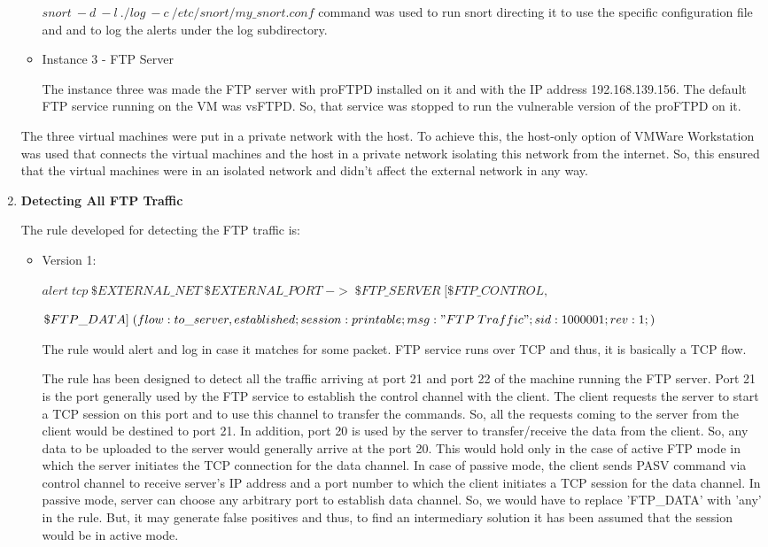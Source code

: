 \documentclass[11pt, pdftex]{article}
\begin{document}
\begin{enumerate}
\begin{itemize}
$snort\: -d\: -l\: ./log\: -c\: /etc/snort/my\_snort.conf$ command was used to run snort directing it to use the specific configuration file and and to log the alerts under the log subdirectory.

	\item Instance 3 - FTP Server
	
	The instance three was made the FTP server with proFTPD installed on it and with the IP address 192.168.139.156. The default FTP service running on the VM was vsFTPD. So, that service was stopped to run the vulnerable version of the proFTPD on it. 

\end{itemize}

The three virtual machines were put in a private network with the host. To achieve this, the host-only option of VMWare Workstation was used that connects the virtual machines and the host in a private network isolating this network from the internet. So, this ensured that the virtual machines were in an isolated network and didn't affect the external network in any way. 

	\item \textbf{Detecting All FTP Traffic}

The rule developed for detecting the FTP traffic is:

\begin{itemize}
	\item Version 1:

$alert\; tcp\; \$EXTERNAL\_NET\; \$EXTERNAL\_PORT\; ->\; \$FTP\_SERVER\; [\$FTP\_CONTROL,\;$

$\$FTP\_DATA]\; 
(flow:to\_server,established;session:printable;msg:"FTP\; Traffic";sid:1000001;rev:1;)$

The rule would alert and log in case it matches for some packet. FTP service runs over TCP and thus, it is basically a TCP flow. 

The rule has been designed to detect all the traffic arriving at port 21 and port 22 of the machine running the FTP server. Port 21 is the port generally used by the FTP service to establish the control channel with the client. The client requests the server to start a TCP session on this port and to use this channel to transfer the commands. So, all the requests coming to the server from the client would be destined to port 21. In addition, port 20 is used by the server to transfer/receive the data from the client. So, any data to be uploaded to the server would generally arrive at the port 20. This would hold only in the case of active FTP mode in which the server initiates the TCP connection for the data channel. In case of passive mode, the client sends PASV command via control channel to receive server's IP address and a port number to which the client initiates a TCP session for the data channel. In passive mode, server can choose any arbitrary port to establish data channel. So, we would have to replace 'FTP\_DATA' with 'any' in the rule. But, it may generate false positives and thus, to find an intermediary solution it has been assumed that the session would be in active mode.


\end{itemize}
\end{enumerate}
\end{document}
